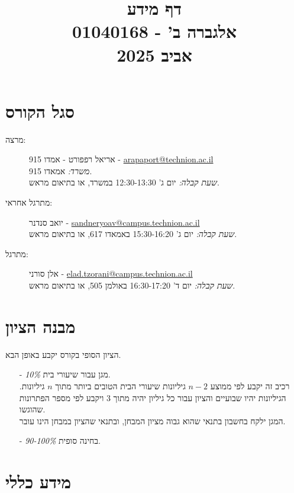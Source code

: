 \documentclass{article}
\title{דף מידע \\ אלגברה ב' - 01040168 \\ אביב 2025}
\date{}
\begin{document}
\maketitle

\section*{סגל הקורס}

\begin{description}
\item[מרצה:]
אריאל רפפורט
-
אמדו 915
-
\textenglish{\href{mailto:arapaport@technion.ac.il}{arapaport@technion.ac.il}}
\\
\emph{משרד:}
אמאדו 915.
\\
\emph{שעת קבלה:}
יום ג' 12:30-13:30 במשרד, או בתיאום מראש.

\item[מתרגל אחראי:] 
יואב סנדנר
-
\textenglish{\href{mailto:sandneryoav@campus.technion.ac.il}{sandneryoav@campus.technion.ac.il}}
\\
\emph{שעת קבלה:}
יום ג' 15:30-16:20 באמאדו 617, או בתיאום מראש.

\item[מתרגל:] 
אלן סורני
-
\textenglish{\href{mailto:elad.tzorani@campus.technion.ac.il}{elad.tzorani@campus.technion.ac.il}}
\\
\emph{שעת קבלה:}
יום ד' 16:30-17:20 באולמן 505, או בתיאום מראש.

\end{description}

\section*{מבנה הציון}

הציון הסופי בקורס יקבע באופן הבא.

\begin{itemize}
\item[-] \emph{10\%}
מגן עבור שיעורי בית.
\\
רכיב זה יקבע לפי ממוצע $n-2$ גיליונות שיעורי הבית הטובים ביותר מתוך $n$ גיליונות. הגיליונות יהיו שבועיים והציון עבור כל גיליון יהיה מתוך 3 ויקבע לפי מספר הפתרונות שהוגשו.
\\
המגן ילקח בחשבון בתנאי שהוא גבוה מציון המבחן, ובתנאי שהציון במבחן הינו עובר.
\item[-] \emph{90-100\%}
בחינה סופית.
\end{itemize}

\section*{מידע כללי}
\end{document}
